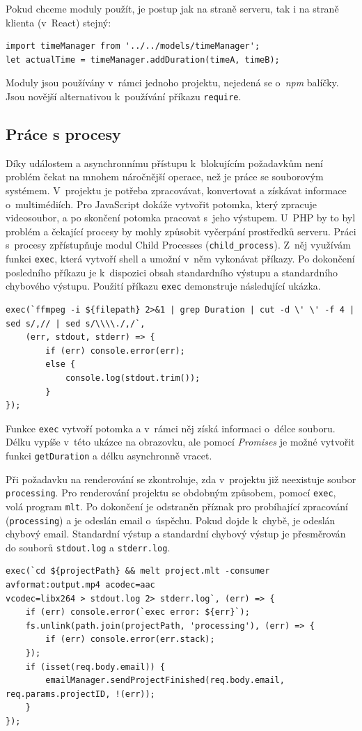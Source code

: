 Pokud chceme moduly použít, je postup jak na straně serveru, tak i na straně klienta (v~React) stejný:
\begin{lstlisting}[style=JavaScript]
import timeManager from '../../models/timeManager';
let actualTime = timeManager.addDuration(timeA, timeB);
\end{lstlisting}

Moduly jsou používány v~rámci jednoho projektu, nejedená se o~\textit{npm} balíčky. Jsou novější alternativou k~používání příkazu \texttt{require}.

\subsection{Práce s procesy}\label{ch:Práce s procesy}
Díky událostem a asynchronnímu přístupu k~blokujícím požadavkům není problém čekat na mnohem náročnější operace, než je práce se souborovým systémem. V~projektu je potřeba zpracovávat, konvertovat a získávat informace o~multimédiích. Pro JavaScript dokáže vytvořit potomka, který zpracuje videosoubor, a po skončení potomka pracovat s~jeho výstupem. U~PHP by to byl problém a čekající procesy by mohly způsobit vyčerpání prostředků serveru. Práci s~procesy zpřístupňuje modul Child Processes (\texttt{child\_process}). Z~něj využívám funkci \texttt{exec}, která vytvoří shell a umožní v~něm vykonávat příkazy. Po dokončení posledního příkazu je k~dispozici obsah standardního výstupu a standardního chybového výstupu. Použití příkazu \texttt{exec} demonstruje následující ukázka.
\begin{lstlisting}[style=JavaScript]
exec(`ffmpeg -i ${filepath} 2>&1 | grep Duration | cut -d \' \' -f 4 | sed s/,// | sed s/\\\\./,/`,
    (err, stdout, stderr) => {
        if (err) console.error(err);
        else {
            console.log(stdout.trim());
        }
});
\end{lstlisting}
Funkce \texttt{exec} vytvoří potomka a v~rámci něj získá informaci o~délce souboru. Délku vypíše v~této ukázce na obrazovku, ale pomocí \textit{Promises} je možné vytvořit funkci \texttt{getDuration} a délku asynchronně vracet.

Při požadavku na renderování se zkontroluje, zda v~projektu již neexistuje soubor \texttt{processing}. Pro renderování projektu se obdobným způsobem, pomocí \texttt{exec}, volá program \texttt{mlt}. Po dokončení je odstraněn příznak pro probíhající zpracování (\texttt{processing}) a je odeslán email o~úspěchu. Pokud dojde k~chybě, je odeslán chybový email. Standardní výstup a standardní chybový výstup je přesměrován do souborů \texttt{stdout.log} a \texttt{stderr.log}.
\begin{lstlisting}[style=JavaScript]
exec(`cd ${projectPath} && melt project.mlt -consumer avformat:output.mp4 acodec=aac
vcodec=libx264 > stdout.log 2> stderr.log`, (err) => {
    if (err) console.error(`exec error: ${err}`);
    fs.unlink(path.join(projectPath, 'processing'), (err) => {
        if (err) console.error(err.stack);
    });
    if (isset(req.body.email)) {
        emailManager.sendProjectFinished(req.body.email, req.params.projectID, !(err));
    }
});
\end{lstlisting}\textbf{}

